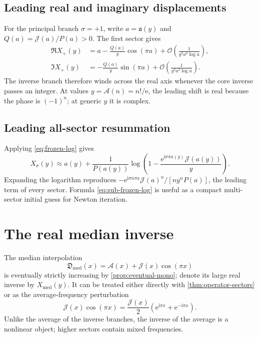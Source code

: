 \documentclass[11pt,a4paper]{article}
\numberwithin{equation}{section}
\theoremstyle{definition}
\theoremstyle{remark}
\newcommand{\e}{\mathrm e}
\newcommand{\ii}{\mathrm i}
\newcommand{\Ord}{\mathcal O}
\newcommand{\Sub}{\mathfrak D}
\newcommand{\Core}{\mathcal A}
\newcommand{\Tail}{\mathcal J}
\newcommand{\InvCore}{\mathfrak a}
\newcommand{\med}{\mathrm{med}}
\begin{document}
\subsection{Leading real and imaginary displacements}

For the principal branch $\sigma=+1$, write $a=\InvCore(y)$ and
$Q(a)=\Tail(a)/P(a)>0$.  The first sector gives
\begin{align}
 \Re X_+(y)&=a-\frac{Q(a)}{y}\cos(\pi a)
 +\Ord\!\left(\frac1{y^2a^2\log a}\right),
 \label{eq:principal-real-leading}\\
 \Im X_+(y)&=-\frac{Q(a)}{y}\sin(\pi a)
 +\Ord\!\left(\frac1{y^2a^2\log a}\right).
 \label{eq:principal-imag-leading}
\end{align}
The inverse branch therefore winds across the real axis whenever the core
inverse passes an integer.  At values $y=\Core(n)=n!/\e$, the leading shift
is real because the phase is $(-1)^n$; at generic $y$ it is complex.

\subsection{Leading all-sector resummation}

Applying \eqref{eq:frozen-log} gives
\begin{equation}\label{eq:sub-frozen-log}
 X_\sigma(y)\approx a(y)+\frac1{P(a(y))}
 \log\left(1-\frac{\e^{\ii\sigma\pi a(y)}\Tail(a(y))}{y}\right).
\end{equation}
Expanding the logarithm reproduces
$-\e^{\ii\sigma n\pi a}\Tail(a)^n/[n y^nP(a)]$, the leading term of every
sector.  Formula \eqref{eq:sub-frozen-log} is useful as a compact
multi-sector initial guess for Newton iteration.

\section{The real median inverse}
\label{sec:median-inverse}

The median interpolation
\[
 \Sub_{\med}(x)=\Core(x)+\Tail(x)\cos(\pi x)
\]
is eventually strictly increasing by \cref{prop:eventual-mono}; denote its
large real inverse by $X_{\med}(y)$.  It can be treated either directly with
\cref{thm:operator-sectors} or as the average-frequency perturbation
\[
 \Tail(x)\cos(\pi x)=\frac{\Tail(x)}2
 \left(\e^{\ii\pi x}+\e^{-\ii\pi x}\right).
\]
Unlike the average of the inverse branches, the inverse of the average is a
nonlinear object; higher sectors contain mixed frequencies.
\end{document}
